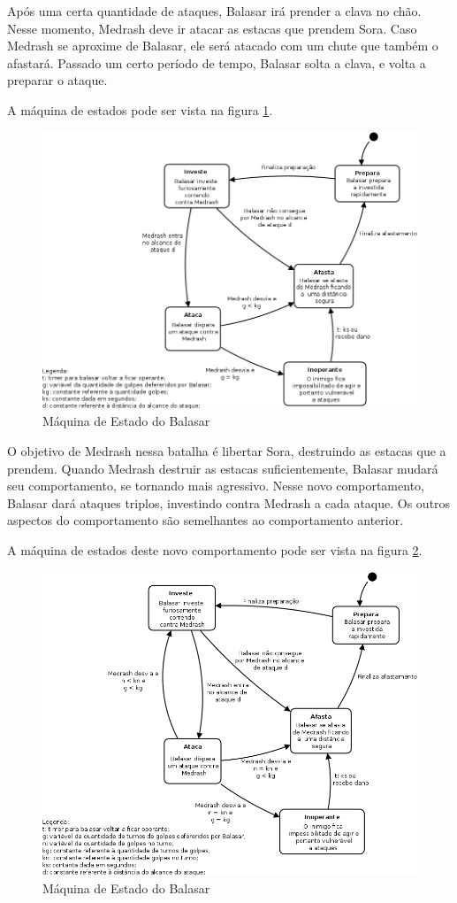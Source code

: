 Após uma certa quantidade de ataques, Balasar irá prender a clava no
chão. Nesse momento, Medrash deve ir atacar as estacas que prendem Sora.
Caso Medrash se aproxime de Balasar, ele será atacado com um chute que
também o afastará. Passado um certo período de tempo, Balasar solta a
clava, e volta a preparar o ataque.

A máquina de estados pode ser vista na figura \ref{fsm:balasar_e1}.

\begin{figure}[!ht]
 \centering
 \includegraphics[scale=0.37]{ia_balasar_e1.png}
 \caption{Máquina de Estado do Balasar}
 \label{fsm:balasar_e1}
\end{figure}

O objetivo de Medrash nessa batalha é libertar Sora, destruindo as 
estacas que a prendem. Quando Medrash destruir as estacas suficientemente,
Balasar mudará seu comportamento, se tornando mais agressivo.
Nesse novo comportamento, Balasar dará ataques triplos, investindo contra
Medrash a cada ataque. Os outros aspectos do comportamento são semelhantes
ao comportamento anterior.

A máquina de estados deste novo comportamento pode ser vista na figura
 \ref{fsm:balasar_e2}.

\begin{figure}[!ht]
 \centering
 \includegraphics[scale=0.37]{ia_balasar_e2.png}
 \caption{Máquina de Estado do Balasar}
 \label{fsm:balasar_e2}
\end{figure}